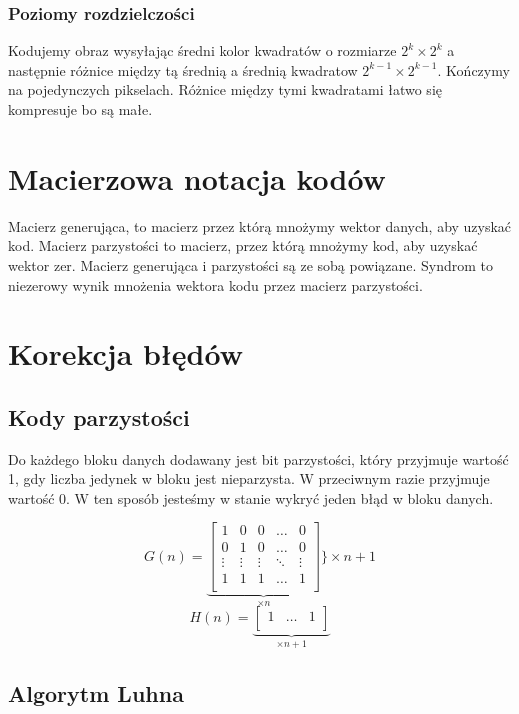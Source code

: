 \documentclass{../notatki}
\begin{document}
\subsubsection{Poziomy rozdzielczości}

Kodujemy obraz wysyłając średni kolor kwadratów o rozmiarze $2^k \times 2^k$
a następnie różnice między tą średnią a średnią kwadratow $2^{k-1}
\times 2^{k-1}$. Kończymy na pojedynczych pikselach. Różnice między tymi
kwadratami łatwo się kompresuje bo są małe.

\section{Macierzowa notacja kodów}

Macierz generująca, to macierz przez którą mnożymy wektor danych, aby uzyskać
kod. Macierz parzystości to macierz, przez którą mnożymy kod, aby uzyskać
wektor zer. Macierz generująca i parzystości są ze sobą powiązane.
Syndrom to niezerowy wynik mnożenia wektora kodu przez macierz parzystości.

\section{Korekcja błędów}

\subsection{Kody parzystości}

Do każdego bloku danych dodawany jest bit parzystości, który przyjmuje wartość
1, gdy liczba jedynek w bloku jest nieparzysta. W przeciwnym razie
przyjmuje wartość 0. W ten sposób jesteśmy w stanie wykryć jeden błąd w bloku
danych.

$$
G(n) =
\underbrace{
  \begin{bmatrix}
    1 & 0 & 0 & \dots & 0 \\
    0 & 1 & 0 & \dots & 0 \\
    \vdots & \vdots & \vdots & \ddots & \vdots \\
    1 & 1 & 1 & \dots & 1 \\
  \end{bmatrix}
}_{\times n}
\Bigg \} \times n + 1
$$
$$
H(n) = \underbrace{
\begin{bmatrix}
  1 & \dots & 1 \\
\end{bmatrix}
}_{\times n + 1}
$$

\subsection{Algorytm Luhna}
\end{document}

